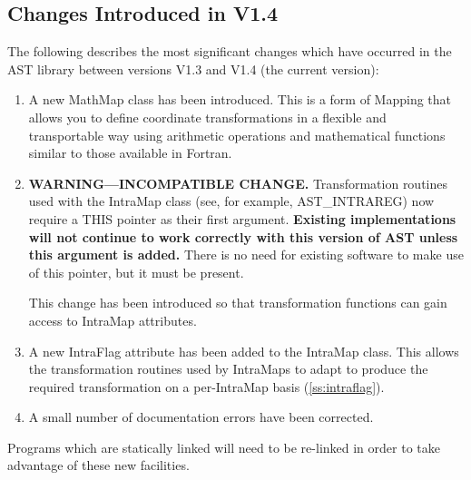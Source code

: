 \documentclass[twoside,11pt]{article}
\newcommand{\htmlref}[2]{#1}
\newcommand{\xlabel}[1]{}
\newcommand{\secref}[1]{\S\ref{#1}}
\renewcommand{\secref}[1]{\ref{#1}}
\begin{document}
\subsection{\xlabel{changes}\xlabel{list_of_most_recent_changes}Changes Introduced in V1.4}

The following describes the most significant changes which have
occurred in the AST library between versions V1.3 and V1.4 (the
current version):

\begin{enumerate}
\item A new \htmlref{MathMap}{MathMap} class has been introduced. This is a form of
\htmlref{Mapping}{Mapping} that allows you to define coordinate transformations in a
flexible and transportable way using arithmetic operations and
mathematical functions similar to those available in Fortran.

\item {\bf{WARNING---INCOMPATIBLE CHANGE.}} Transformation routines
used with the \htmlref{IntraMap}{IntraMap} class (see, for example, \htmlref{AST\_INTRAREG}{AST_INTRAREG}) now
require a THIS pointer as their first argument. {\bf{Existing
implementations will not continue to work correctly with this version
of AST unless this argument is added.}} There is no need for existing
software to make use of this pointer, but it must be present.

This change has been introduced so that transformation functions can gain
access to IntraMap attributes.

\item A new \htmlref{IntraFlag}{IntraFlag} attribute has been added to the IntraMap
class. This allows the transformation routines used by IntraMaps to
adapt to produce the required transformation on a per-IntraMap basis
(\secref{ss:intraflag}).

\item A small number of documentation errors have been corrected.
\end{enumerate}

Programs which are statically linked will need to be re-linked in
order to take advantage of these new facilities.
\end{document}

